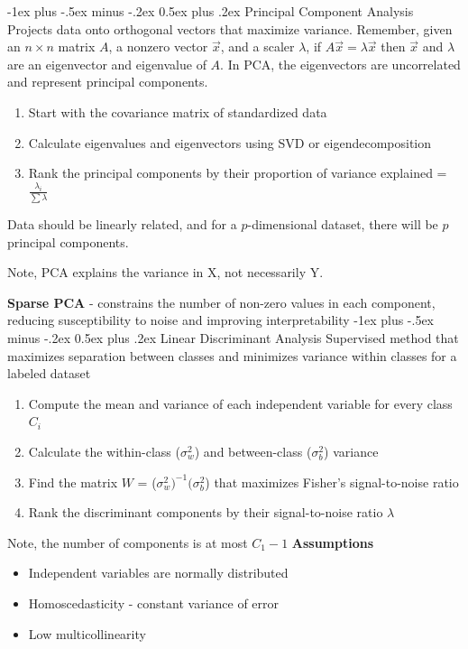 \documentclass[10pt,landscape]{article}
\makeatletter
\renewcommand{\subsection}{\@startsection{subsection}{2}{0mm}%
                                {-1ex plus -.5ex minus -.2ex}%
                                {0.5ex plus .2ex}%
                                {\normalfont\normalsize\bfseries}}
\makeatother
\begin{document}
\begin{multicols}{3}
    \subsection{Principal Component Analysis}
    Projects data onto orthogonal vectors that maximize variance.
    Remember, given an $n\times n$ matrix $A$, a nonzero vector $\vec{x}$, and a scaler $\lambda$, if $A\vec{x} = \lambda \vec{x}$ then $\vec{x}$ and $\lambda$ are an eigenvector and eigenvalue of $A$. In PCA, the eigenvectors are uncorrelated and represent principal components.
    \begin{enumerate}[leftmargin=5mm]
        \itemsep -.4mm
        \item Start with the covariance matrix of standardized data
        \item Calculate eigenvalues and eigenvectors using SVD or eigendecomposition
        \item Rank the principal components by their proportion of variance explained = $\frac{\lambda_i}{\sum{\lambda}}$
    \end{enumerate}

    Data should be linearly related, and for a $p$-dimensional dataset, there will be $p$ principal components.

    Note, PCA explains the variance in X, not necessarily Y.

    \textbf{Sparse PCA} - constrains the number of non-zero values in each component, reducing susceptibility to noise and improving interpretability
    \subsection{Linear Discriminant Analysis}
    Supervised method that maximizes separation between classes and minimizes variance within classes for a labeled dataset
    \begin{enumerate}[leftmargin=5mm]
        \itemsep -.4mm
        \item Compute the mean and variance of each independent variable for every class $C_i$
        \item Calculate the within-class ($\sigma_w^2$) and between-class ($\sigma_b^2$) variance
        \item Find the matrix $W$ = ($\sigma_w^2)^{-1}(\sigma_b^2$) that maximizes Fisher's signal-to-noise ratio
        \item Rank the discriminant components by their signal-to-noise ratio $\lambda$
    \end{enumerate}
    Note, the number of components is at most $C_1 - 1$
    \textbf{Assumptions}
    \vspace{-.7mm}
    \begin{itemize}[label={--},leftmargin=4mm]
        \itemsep -.4mm
        \item Independent variables are normally distributed
        \item Homoscedasticity - constant variance of error
        \item Low multicollinearity
    \end{itemize}



\end{multicols}
\end{document}
